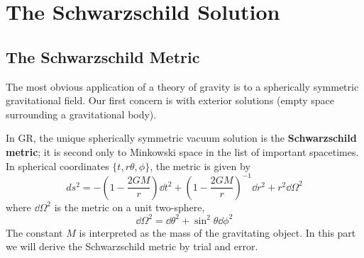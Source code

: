 \section{The Schwarzschild Solution}

\subsection{The Schwarzschild Metric}
The most obvious application of a theory of gravity is to a spherically symmetric gravitational field. Our first concern is with exterior solutions (empty space surrounding a gravitational body).

In GR, the unique spherically symmetric vacuum solution is the \textbf{Schwarzschild metric}; it is second only to Minkowski space in the list of important spacetimes. In spherical coordinates $\{t,r\theta,\phi \}$, the metric is given by
\begin{equation}\label{5.1}
    \boxed{ds^2=-\left(1-\frac{2GM}{r}\right)\dd t^2+\left(1-\frac{2GM}{r}\right)^{-1}\dd r^2+r^2\dd \Omega^2}
\end{equation}
where $\dd\Omega^2$ is the metric on a unit two-sphere,
\begin{equation*}
    \dd\Omega^2=\dd\theta^2+\sin^2\theta\dd\phi^2
\end{equation*}
The constant $M$ is interpreted as the mass of the gravitating object. In this part we will derive the Schwarzschild metric by trial and error.

